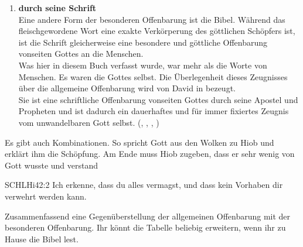 \begin{otsblock}
\begin{enumerate}
\begin{bibelbox}{SCHL}{Hebr}{1:3}
        \end{bibelbox}
        \begin{bibelbox}{SCHL}{Joh}{14:6-7}
            Jesus spricht zu ihm (Thomas): \enquote{Ich bin der Weg und die Wahrheit und das Leben; niemand kommt zum Vater als nur durch mich! Wenn ihr mich erkannt hättet, so hättet ihr auch meinen Vater erkannt; und von nun an erkennt ihr ihn und habt ihn gesehen.}
        \end{bibelbox}
        \item \textbf{durch seine Schrift}\\
        Eine andere Form der besonderen Offenbarung ist die Bibel. Während das fleischgewordene Wort eine exakte Verkörperung des göttlichen Schöpfers ist, ist die Schrift gleicherweise eine besondere und göttliche Offenbarung vonseiten Gottes an die Menschen.\\
        Was hier in diesem Buch verfasst wurde, war mehr als die Worte von Menschen. Es waren die  Gottes selbst. Die Überlegenheit dieses Zeugnisses über die allgemeine Offenbarung wird von David in  bezeugt.\\
        Sie ist eine schriftliche Offenbarung vonseiten Gottes durch seine Apostel und Propheten und ist dadurch ein dauerhaftes und für immer fixiertes Zeugnis vom unwandelbaren Gott selbst. (, , , )
    \end{enumerate}    
    Es gibt auch Kombinationen. So spricht Gott aus den Wolken zu Hiob und erklärt ihm die Schöpfung.  Am Ende muss Hiob zugeben, dass er sehr wenig von Gott wusste und verstand
    \begin{bibelbox}{SCHL}{Hi}{42:2}
        Ich erkenne, dass du alles vermagst, und dass kein Vorhaben dir verwehrt werden kann.    
    \end{bibelbox}
\end{otsblock}
Zusammenfassend eine Gegenüberstellung der allgemeinen Offenbarung mit der besonderen Offenbarung. Ihr könnt die Tabelle beliebig erweitern, wenn ihr zu Hause die Bibel lest.
